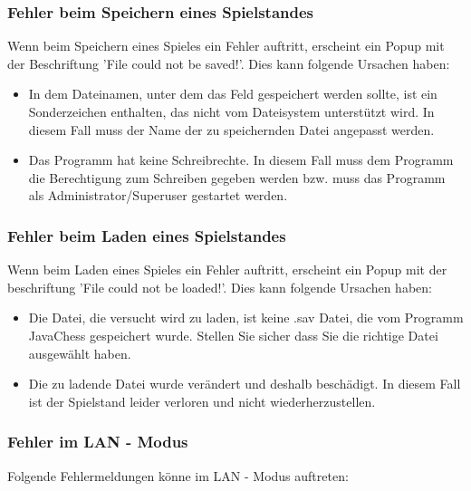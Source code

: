 \documentclass[12pt,a4paper]{article}
\begin{document}
 \subsubsection{Fehler beim Speichern eines Spielstandes}
 
Wenn beim Speichern eines Spieles ein Fehler auftritt, erscheint ein Popup mit der Beschriftung 'File could not be saved!'. Dies kann folgende Ursachen haben:
\begin{itemize}

\item{In dem Dateinamen, unter dem das Feld gespeichert werden sollte, ist ein Sonderzeichen enthalten, das nicht vom Dateisystem unterstützt wird. In diesem Fall muss der Name der zu speichernden Datei angepasst werden. }

\item{Das Programm hat keine Schreibrechte. In diesem Fall muss dem Programm die Berechtigung zum Schreiben gegeben werden bzw. muss das Programm als Administrator/Superuser gestartet werden. }

\end{itemize}

	\subsubsection{Fehler beim Laden eines Spielstandes}

Wenn beim Laden eines Spieles ein Fehler auftritt, erscheint ein Popup mit der beschriftung 'File could not be loaded!'. Dies kann folgende Ursachen haben:

\begin{itemize}

\item{Die Datei, die versucht wird zu laden, ist keine .sav Datei, die vom Programm JavaChess gespeichert wurde. Stellen Sie sicher dass Sie die richtige Datei ausgewählt haben. }

\item{Die zu ladende Datei wurde verändert und deshalb beschädigt. In diesem Fall ist der Spielstand leider verloren und nicht wiederherzustellen.}


\end{itemize}

	\subsubsection{Fehler im LAN - Modus}
Folgende Fehlermeldungen könne im LAN - Modus auftreten:
\end{document}
